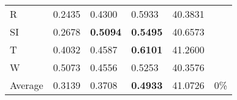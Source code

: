 \documentclass[11pt, a4paper]{article}
\begin{document}
\begin{table}[H]
\begin{tabular}{llllll}
R                                & 0.2435                            & 0.4300                            & 0.5933                               & 40.3831                                     &                                   \\
SI                        & 0.2678                            & \textbf{0.5094}                   & \textbf{0.5495}                      & 40.6573                                     &                                   \\
T                              & 0.4032                            & 0.4587                            & \textbf{0.6101}                      & 41.2600                                     &                                   \\
W                             & 0.5073                            & 0.4556                            & 0.5253                               & 40.3576                                     &                                   \\ \hline
Average                               & 0.3139                            & 0.3708                            & \textbf{0.4933}                      & 41.0726                                     & 0\%
\end{tabular}
\end{table}
\end{document}
